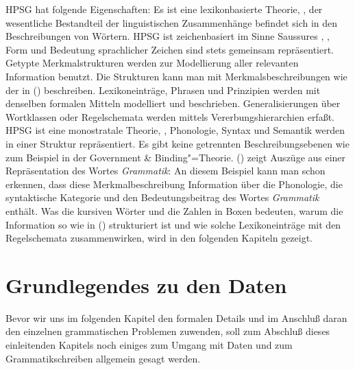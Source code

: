 HPSG hat folgende Eigenschaften: Es ist eine lexikonbasierte Theorie,
\dash, der wesentliche Bestandteil der linguistischen Zusammenhänge
befindet sich in den Beschreibungen von Wörtern. HPSG ist zeichenbasiert
im Sinne Saussures \citeyearpar{Saussure16a-de}, \dash, Form und Bedeutung
sprachlicher Zeichen sind stets gemeinsam repräsentiert. Getypte
Merkmalstrukturen werden zur Modellierung
aller relevanten Information benutzt. Die Strukturen kann man mit Merkmalsbeschreibungen wie der in
() beschreiben. Lexikoneinträge, Phrasen
und Prinzipien werden mit denselben formalen Mitteln modelliert und beschrieben.
Generalisierungen über Wortklassen oder Regelschemata werden
mittels Vererbungshierarchien erfaßt.
HPSG ist eine monostratale Theorie, \dash, Phonologie, Syntax
und Semantik werden in einer Struktur repräsentiert. Es gibt keine
getrennten Beschreibungsebenen wie zum Beispiel in der Government \& Binding"=Theorie.
() zeigt Auszüge aus einer Repräsentation des Wortes \emph{Grammatik}:
\ea
{}
\z
An diesem Beispiel kann man schon erkennen, dass diese Merkmalbeschreibung
Information über die Phonologie, die syntaktische Kategorie und den Bedeutungsbeitrag
des Wortes \emph{Grammatik} enthält. Was die kursiven Wörter und die Zahlen in Boxen
bedeuten, warum die Information so wie in () strukturiert ist und wie solche Lexikoneinträge
mit den Regelschemata zusammenwirken, wird in den folgenden Kapiteln gezeigt.

\section{Grundlegendes zu den Daten}
\label{sec-grundlegendes-zu-daten}

Bevor wir uns im folgenden Kapitel den formalen Details und im Anschluß daran den einzelnen
grammatischen Problemen zuwenden, soll zum Abschluß dieses einleitenden Kapitels noch einiges zum
Umgang mit Daten und zum Grammatikschreiben allgemein gesagt werden.

